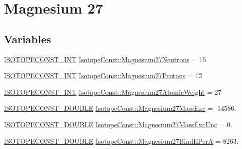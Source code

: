 \hypertarget{group___isotope_const-_magnesium-_mg27}{}\section{Magnesium 27}
\label{group___isotope_const-_magnesium-_mg27}
\subsection*{Variables}
\begin{DoxyCompactItemize}
\item 
\mbox{\hyperlink{group___isotope_const-_macros_ga5f18360b3e99483a35c32d789e62621c}{I\+S\+O\+T\+O\+P\+E\+C\+O\+N\+S\+T\+\_\+\+I\+NT}} \mbox{\hyperlink{group___isotope_const-_magnesium-_mg27_gac1c07194199c3753ba5686f1eed5d07c}{Isotope\+Const\+::\+Magnesium27\+Neutrons}} = 15
\item 
\mbox{\hyperlink{group___isotope_const-_macros_ga5f18360b3e99483a35c32d789e62621c}{I\+S\+O\+T\+O\+P\+E\+C\+O\+N\+S\+T\+\_\+\+I\+NT}} \mbox{\hyperlink{group___isotope_const-_magnesium-_mg27_ga57d7f07b7bc20cc215b6b57e3f0cfa2d}{Isotope\+Const\+::\+Magnesium27\+Protons}} = 12
\item 
\mbox{\hyperlink{group___isotope_const-_macros_ga5f18360b3e99483a35c32d789e62621c}{I\+S\+O\+T\+O\+P\+E\+C\+O\+N\+S\+T\+\_\+\+I\+NT}} \mbox{\hyperlink{group___isotope_const-_magnesium-_mg27_ga1a558ebbedc0d5dd0d797628f839337a}{Isotope\+Const\+::\+Magnesium27\+Atomic\+Weight}} = 27
\item 
\mbox{\hyperlink{group___isotope_const-_macros_ga8f45a7272ce02c0b4c65c44636ed719a}{I\+S\+O\+T\+O\+P\+E\+C\+O\+N\+S\+T\+\_\+\+D\+O\+U\+B\+LE}} \mbox{\hyperlink{group___isotope_const-_magnesium-_mg27_ga86285f1595a5643b835fc9581149e908}{Isotope\+Const\+::\+Magnesium27\+Mass\+Exc}} = -\/14586.
\item 
\mbox{\hyperlink{group___isotope_const-_macros_ga8f45a7272ce02c0b4c65c44636ed719a}{I\+S\+O\+T\+O\+P\+E\+C\+O\+N\+S\+T\+\_\+\+D\+O\+U\+B\+LE}} \mbox{\hyperlink{group___isotope_const-_magnesium-_mg27_gad1a1f86bff05af9fc73047e0928bab80}{Isotope\+Const\+::\+Magnesium27\+Mass\+Exc\+Unc}} = 0.
\item 
\mbox{\hyperlink{group___isotope_const-_macros_ga8f45a7272ce02c0b4c65c44636ed719a}{I\+S\+O\+T\+O\+P\+E\+C\+O\+N\+S\+T\+\_\+\+D\+O\+U\+B\+LE}} \mbox{\hyperlink{group___isotope_const-_magnesium-_mg27_ga07520331a981d07e27e3bb7136a46c06}{Isotope\+Const\+::\+Magnesium27\+Bind\+E\+PerA}} = 8263.
\item 

\end{DoxyCompactItemize}
